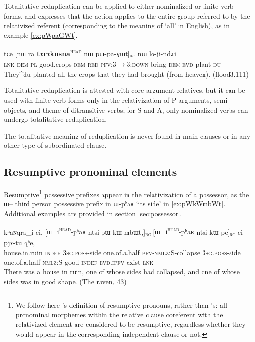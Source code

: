\documentclass[oldfontcommands,oneside,a4paper,11pt]{article}
\newcommand{\ipa}[1]{{\phon #1}} %
\newcommand{\topic}{\textsc{dem}}
\newcommand{\tete}{\textsuperscript{\textsc{head}}}
\newcommand{\rc}{\textsubscript{\textsc{rc}}}
\begin{document}
Totalitative reduplication  can be applied to either nominalized or finite verb forms, and expresses that the action applies to the entire group referred to by the relativized referent (corresponding to the meaning of `all' in English), as in example \ref{ex:pWpaGWt}.

  \begin{exe}
\ex \label{ex:pWpaGWt}
\gll
\ipa{tɕe}  	[\ipa{nɯ} \ipa{ra}  	\textbf{\ipa{tɤrɤkusna}}\tete{}  	\ipa{nɯ}  	\ipa{pɯ-pa-ɣɯt}]\rc{}  	\ipa{nɯ}  	\ipa{lo-ji-ndʑi}  \\
\textsc{lnk} \textsc{dem} \textsc{pl} good.crops \topic{} \textsc{red-pfv:3$\rightarrow$3:down}-bring \topic{} \textsc{evd}-plant-\textsc{du} \\
\glt They^{du} planted all the crops that they had brought (from heaven). (flood3.111)
\end{exe}
 
Totalitative reduplication is attested with core argument relatives, but it can be used with finite verb forms only in the relativization of P arguments, semi-objects, and theme of ditransitive verbs; for S and A, only nominalized verbs can undergo totalitative reduplication. 

The totalitative meaning of reduplication is never found in main clauses or in any other type of subordinated clause.


\subsection{Resumptive pronominal elements} \label{sec:resumptive}
 

Resumptive\footnote{We follow here \citet[211]{creissels06sgit2}'s definition of resumptive pronouns, rather than \citet{comrie81relative}'s: all pronominal morphemes within the relative clause coreferent with the relativized element are considered to be resumptive, regardless whether they would appear in the corresponding independent clause or not. } possessive prefixes appear in the relativization of a possessor, as the \ipa{ɯ}-- third person possessive prefix in \ipa{ɯ-pʰaʁ} `its side' in  \ref{ex:pWkWmbWt}. Additional examples are provided in section \ref{sec:possessor}.

  \begin{exe}
\ex \label{ex:pWkWmbWt}
\gll
\ipa{kʰaɴqra}_i  	\ipa{ci,}  	[\ipa{ɯ_i\tete{}-pʰaʁ}	\ipa{ntsi}  	\ipa{pɯ-kɯ-mbɯt,}]\rc{}  	[\ipa{ɯ_i\tete{}-pʰaʁ}   	\ipa{ntsi}  	\ipa{kɯ-pe}]\rc{}  	\ipa{ci}  	\ipa{pjɤ-tu}  	\ipa{qʰe,}  \\
house.in.ruin \textsc{indef} \textsc{3sg.poss}-side one.of.a.half \textsc{pfv-nmlz}:S-collapse \textsc{3sg.poss}-side one.of.a.half \textsc{nmlz}:S-good \textsc{indef} \textsc{evd.ipfv}-exist  \textsc{lnk} \\
\glt There was a house in ruin, one of whose sides had collapsed, and one of whose sides was in good shape. (The raven, 43)
\end{exe}
\end{document}

